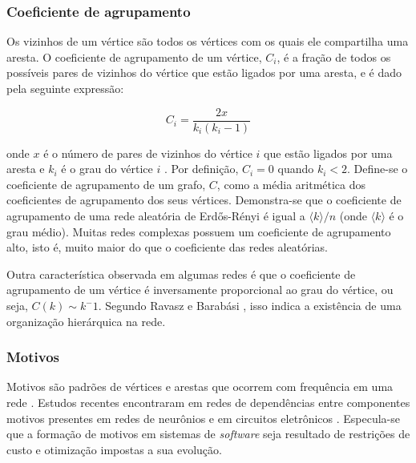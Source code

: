 ﻿\documentclass{article}
\begin{document}


\subsubsection{Coeficiente de agrupamento}

Os vizinhos de um vértice são todos os vértices com os quais ele compartilha uma aresta. O coeficiente de agrupamento de um vértice, $C_i$, é a fração de todos os possíveis pares de vizinhos do vértice que estão ligados por uma aresta, e é dado pela seguinte expressão:

\[  C_i = \frac{2x}{k_i(k_i - 1)} \]

onde $x$ é o número de pares de vizinhos do vértice $i$ que estão ligados por uma aresta e $k_i$ é o grau do vértice $i$ \cite{Watts1998}. Por definição, $C_i = 0$ quando $k_i < 2$. Define-se o coeficiente de agrupamento de um grafo, $C$, como a média aritmética dos coeficientes de agrupamento dos seus vértices. Demonstra-se que o coeficiente de agrupamento de uma rede aleatória de Erdős-Rényi é igual a $\langle k \rangle / n$ (onde $\langle k \rangle$ é o grau médio). Muitas redes complexas possuem um coeficiente de agrupamento alto, isto é, muito maior do que o coeficiente das redes aleatórias.

Outra característica observada em algumas redes é que o coeficiente de agrupamento de um vértice é inversamente proporcional ao grau do vértice, ou seja, $C(k) \sim k^-1$. Segundo Ravasz e Barabási \cite{Ravasz2003}, isso indica a existência de uma organização hierárquica na rede.

\subsubsection{Motivos}

Motivos são padrões de vértices e arestas que ocorrem com frequência em uma rede \cite{Milo2002}. Estudos recentes encontraram em redes de dependências entre componentes motivos presentes em redes de neurônios e em circuitos eletrônicos \cite{Valverde2005,Ma2008}. Especula-se que a formação de motivos em sistemas de \textit{software} seja resultado de restrições de custo e otimização impostas a sua evolução.
\end{document}
